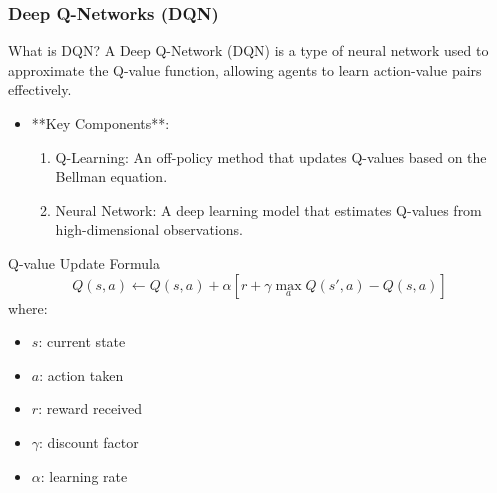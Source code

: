 \documentclass{beamer}
\begin{document}
\begin{frame}[fragile]
    \frametitle{Deep Q-Networks (DQN)}
    \begin{block}{What is DQN?}
        A Deep Q-Network (DQN) is a type of neural network used to approximate the Q-value function, allowing agents to learn action-value pairs effectively.
    \end{block}

    \begin{itemize}
        \item **Key Components**:
        \begin{enumerate}
            \item Q-Learning: An off-policy method that updates Q-values based on the Bellman equation.
            \item Neural Network: A deep learning model that estimates Q-values from high-dimensional observations.
        \end{enumerate}
    \end{itemize}
    
    \begin{block}{Q-value Update Formula}
    \begin{equation}
    Q(s, a) \gets Q(s, a) + \alpha \left[ r + \gamma \max_a Q(s', a) - Q(s, a) \right]
    \end{equation}
    where:
    \begin{itemize}
        \item \(s\): current state
        \item \(a\): action taken
        \item \(r\): reward received
        \item \(\gamma\): discount factor
        \item \(\alpha\): learning rate
    \end{itemize}
    \end{block}
\end{frame}
\end{document}
